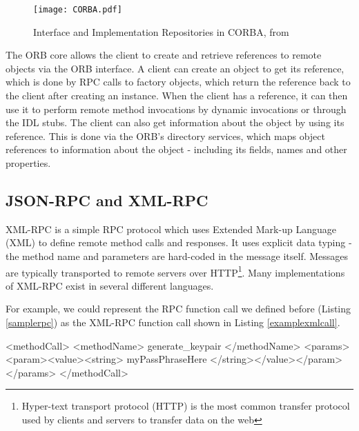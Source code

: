 \begin{figure}
    \centering
    \texttt{[image: CORBA.pdf]}
    \caption{Interface and Implementation Repositories in CORBA, from \cite{isocorba}}
    \label{fig:corba-interfaces}
\end{figure}

The ORB core allows the client to create and retrieve references to remote objects via the ORB interface. A client can create an object to get its reference, which is done by RPC calls to factory objects, which return the reference back to the client after creating an instance. When the client has a reference, it can then use it to perform remote method invocations by dynamic invocations or through the IDL stubs. The client can also get information about the object by using its reference. This is done via the ORB's directory services, which maps object references to information about the object - including its fields, names and other properties.  \cite{vinoski1997corba}



\subsection{JSON-RPC and XML-RPC} %
\label{sub:json_xml_rpc_intro}
XML-RPC is a simple RPC protocol which uses Extended Mark-up Language (XML) to define remote method calls and responses. It uses explicit data typing - the method name and parameters are hard-coded in the message itself. Messages are typically transported to remote servers over HTTP\footnote{Hyper-text transport protocol (HTTP) is the most common transfer protocol used by clients and servers to transfer data on the web}. Many implementations of XML-RPC exist in several different languages. 

For example, we could represent the RPC function call we defined before (Listing \ref{samplerpc}) as the XML-RPC function call shown in Listing \ref{examplexmlcall}.

\begin{code}
<methodCall>
  <methodName>
    generate_keypair
  </methodName>
  <params>
    <param><value><string> myPassPhraseHere </string></value></param>
  </params>
</methodCall>
\end{code}

